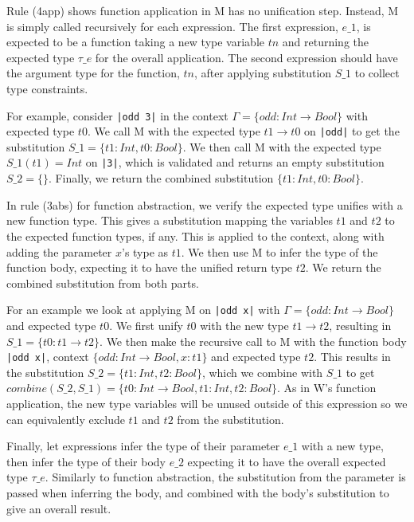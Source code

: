 \documentclass[a4paper,fleqn,12pt]{article}
\begin{document}
Rule (4app) shows function application in M has no unification step. Instead, M is simply called recursively for each expression. The first expression, $e\_1$, is expected to be a function taking a new type variable $tn$ and returning the expected type $\tau\_e$ for the overall application. The second expression should have the argument type for the function, $tn$, after applying substitution $S\_1$ to collect type constraints.

For example, consider \texttt{|odd 3|} in the context $\Gamma = \{ odd: Int \rightarrow Bool \}$ with expected type $t0$. We call M with the expected type $t1 \rightarrow t0$ on \texttt{|odd|} to get the substitution $S\_1 = \{ t1: Int, t0: Bool \}$. We then call M with the expected type $S\_1(t1) = Int$ on \texttt{|3|}, which is validated and returns an empty substitution $S\_2 = \{\}$. Finally, we return the combined substitution $\{ t1: Int, t0: Bool \}$.

In rule (3abs) for function abstraction, we verify the expected type unifies with a new function type. This gives a substitution mapping the variables $t1$ and $t2$ to the expected function types, if any. This is applied to the context, along with adding the parameter $x$’s type as $t1$. We then use M to infer the type of the function body, expecting it to have the unified return type $t2$. We return the combined substitution from both parts.

For an example we look at applying M on \texttt{|\x \rightarrow odd x|} with $\Gamma = \{ odd: Int \rightarrow Bool \}$ and expected type $t0$. We first unify $t0$ with the new type $t1 \rightarrow t2$, resulting in $S\_1 = \{ t0: t1 \rightarrow t2 \}$. We then make the recursive call to M with the function body \texttt{|odd x|}, context $\{ odd: Int \rightarrow Bool, x: t1 \}$ and expected type $t2$. This results in the substitution $S\_2 = \{ t1: Int, t2: Bool \}$, which we combine with $S\_1$ to get $combine(S\_2, S\_1) = \{ t0: Int \rightarrow Bool, t1: Int, t2: Bool \}$. As in W’s function application, the new type variables will be unused outside of this expression so we can equivalently exclude $t1$ and $t2$ from the substitution.

Finally, let expressions infer the type of their parameter $e\_1$ with a new type, then infer the type of their body $e\_2$ expecting it to have the overall expected type $\tau\_e$. Similarly to function abstraction, the substitution from the parameter is passed when inferring the body, and combined with the body’s substitution to give an overall result.
\end{document}
